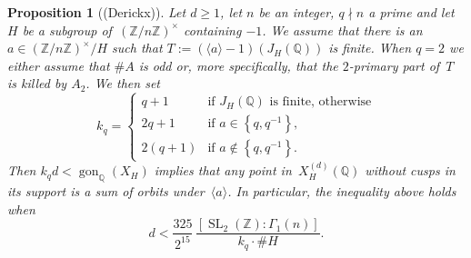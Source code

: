 \documentclass[11pt,reqno]{amsart}
\DeclareMathOperator{\SL}{SL}
\DeclareMathOperator{\gon}{gon}
\newtheorem{proposition}[theorem]{Proposition}
\theoremstyle{definition}
\numberwithin{equation}{section}
\newcommand{\Q}{\mathbb{Q}}
\newcommand{\Z}{\mathbb{Z}}
\newcommand{\diamondop}[1]{\langle #1 \rangle} %
\newcommand{\set}[1]{\left\lbrace #1 \right\rbrace}
\begin{document}
\begin{proposition}[(Derickx)] \label{prop:hecke_gon}
  Let $d \ge 1$, let $n$ be an integer, $q \nmid n$ a prime and let $H$ be a subgroup
  of~$(\Z/n\Z)^\times$ containing $-1$. We assume that there is an $a \in (\Z/n\Z)^\times/ H$ such that $T := (\diamondop{a}-1)(J_H(\Q))$ is finite.
  When $q=2$ we either assume that $\#A$ is odd or, more specifically, that the $2$-primary part of~$T$ is killed by $A_2$.
  We then set
  \[ k_q = \begin{cases}
           q+1 & \text{if $J_H(\Q)$ is finite, otherwise} \\
           2q + 1 & \text{if $a \in \set{q, q^{-1}}$,} \\
           2(q + 1)& \text{if $a \notin \set{q, q^{-1}}$.}
         \end{cases}
  \]
  Then $k_qd < \gon_{\Q}(X_H)$ implies that any point
  in~$X_H^{(d)}(\Q)$ without cusps in its support is a sum of orbits
  under~$\diamondop{a}$. In particular, the inequality above holds when
  \begin{equation}\label{DS-inequality}
      d < \frac{325}{2^{15}} \, \frac{[\SL_2(\mathbb Z) :\Gamma_1(n)]}{k_q \cdot \#H}.
  \end{equation} 
\end{proposition}
\end{document}
